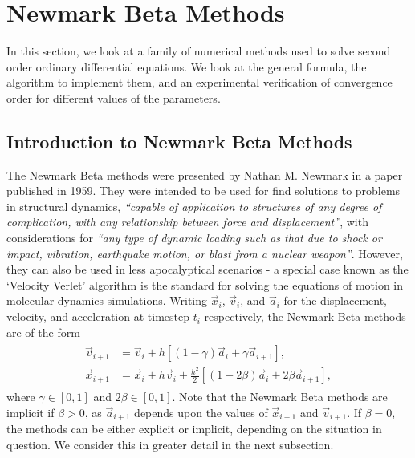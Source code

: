 \documentclass[../Main.tex]{subfiles}
\begin{document}
\section{Newmark Beta Methods}

In this  section, we look at a family of numerical methods used to solve second order ordinary differential equations. We look at the general formula, the algorithm to implement them, and an experimental verification of convergence order for different values of the parameters.

\subsection{Introduction to Newmark Beta Methods}\label{subsection:intro_newmark-beta}
The Newmark Beta methods were presented by Nathan M. Newmark in a paper \cite{Newmark1959} published in 1959. They were intended to be used for find solutions to problems in structural dynamics, \textit{``capable of application to structures of any degree of complication, with any relationship between force and displacement''}, with considerations for \textit{``any type of dynamic loading such as that due to shock or impact, vibration, earthquake motion, or blast from a nuclear weapon''}. However, they can also be used in less apocalyptical scenarios -  a special case known as the `Velocity Verlet' algorithm is the standard for solving the equations of motion in molecular dynamics simulations.
Writing $\vec{x}_{i}$, $\vec{v}_{i}$, and $\vec{a}_{i}$ for the displacement, velocity, and acceleration at timestep $t_{i}$ respectively, the Newmark Beta methods are of the form
\begin{align}
	\begin{split}
		\vec{v}_{i+1} & = \vec{v}_{i} + h\left[\left(1-\gamma \right)\vec{a}_{i} + \gamma \vec{a}_{i+1}\right], \\
		\vec{x}_{i+1} & = \vec{x}_{i} + h\vec{v}_{i} + \frac{h^2}{2}\left[ \left(1-2\beta \right)\vec{a}_{i} + 2\beta \vec{a}_{i+1}\right] ,
	\end{split} \label{eqn:newmark-beta}
\end{align} where $\gamma \in \left[0, 1 \right]$ and $2\beta \in \left[0, 1 \right]$. Note that the Newmark Beta methods are implicit if $\beta > 0$, as $\vec{a}_{i+1}$ depends upon the values of $\vec{x}_{i+1}$ and $\vec{v}_{i+1}$. If $\beta = 0$, the methods can be either explicit or implicit, depending on the situation in question. We consider this in greater detail in the next subsection.
\end{document}
